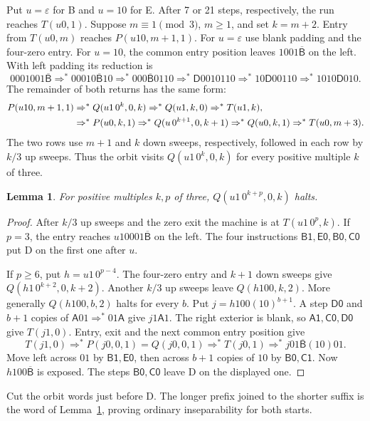 \documentclass[11pt]{article}
\newtheorem{lemma}[theorem]{Lemma}
\newcommand{\state}[1]{\mathsf{#1}}
\newcommand{\run}{\mathrel{\Rightarrow^{*}}}
\newcommand{\eps}{\varepsilon}
\newcommand{\Bleft}{\overline{\state B}}
\begin{document}
Put \(u=\eps\) for B and \(u=10\) for E. After 7 or 21 steps, respectively, the run reaches \(T(u0,1)\). Suppose \(m\equiv1\pmod3\), \(m\ge1\), and set \(k=m+2\). Entry from \(T(u0,m)\) reaches \(P(u10,m+1,1)\). For \(u=\eps\) use blank padding and the four-zero entry. For \(u=10\), the common entry position leaves \(1001\Bleft\) on the left. With left padding its reduction is
\[
0001001\Bleft\run00010\Bleft10\run000\Bleft0110
  \run\state D0010110\run10\state D00110\run1010\state D010.
\]
The remainder of both returns has the same form:
\begin{align}
 P(u10,m+1,1)&\run Q(u1\,0^k,0,k)\run Q(u1,k,0)\run T(u1,k),\notag\\
 &\run P(u0,k,1)\run Q(u\,0^{k+1},0,k+1)
                  \run Q(u0,k,1)\run T(u0,m+3).\label{secondreturn}
\end{align}
The two rows use \(m+1\) and \(k\) down sweeps, respectively, followed in each row by \(k/3\) up sweeps. Thus the orbit visits \(Q(u1\,0^k,0,k)\) for every positive multiple \(k\) of three.

\begin{lemma}\label{leftheavy}
For positive multiples \(k,p\) of three, \(Q(u1\,0^{k+p},0,k)\) halts.
\end{lemma}
\begin{proof}
After \(k/3\) up sweeps and the zero exit the machine is at \(T(u1\,0^p,k)\). If \(p=3\), the entry reaches \(u10001\Bleft\) on the left. The four instructions \(\state{B1,E0,B0,C0}\) put D on the first one after \(u\).

If \(p\ge6\), put \(h=u1\,0^{p-4}\). The four-zero entry and \(k+1\) down sweeps give \(Q(h1\,0^{k+2},0,k+2)\). Another \(k/3\) up sweeps leave \(Q(h100,k,2)\). More generally \(Q(h100,b,2)\) halts for every \(b\). Put \(j=h100(10)^{b+1}\). A step \(\state{D0}\) and \(b+1\) copies of \(\state A01\run01\state A\) give \(j1\state A1\). The right exterior is blank, so \(\state{A1,C0,D0}\) give \(T(j1,0)\). Entry, exit and the next common entry position give
\[
 T(j1,0)\run P(j0,0,1)=Q(j0,0,1)\run T(j0,1)
                    \run j01\Bleft(10)01 .
\]
Move left across \(01\) by \(\state{B1,E0}\), then across \(b+1\) copies of \(10\) by \(\state{B0,C1}\). Now \(h100\Bleft\) is exposed. The steps \(\state{B0,C0}\) leave D on the displayed one.
\end{proof}

Cut the orbit words just before D. The longer prefix joined to the shorter suffix is the word of Lemma~\ref{leftheavy}, proving ordinary inseparability for both starts.
\end{document}
